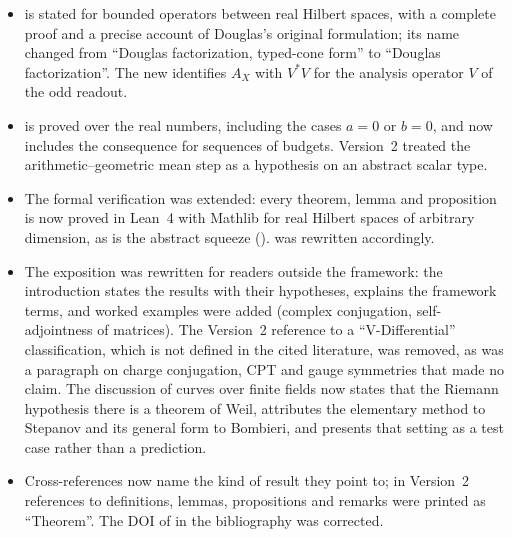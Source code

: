 \documentclass[11pt]{article}
\newcommand{\AX}{A_{X}}
\theoremstyle{definition}
\begin{document}
\begin{itemize}
    state the consequences: the theorem does not make confinement
    easier to prove, its role is to fix the form of a bridge argument,
    and SDTC cannot hold for all involutive ledgers (the
    complex-conjugation example is a counterexample).  Version~2 did
    not state the converse or these consequences.
  \item {} is stated for
    bounded operators between real Hilbert spaces, with a complete proof
    and a precise account of Douglas's original formulation; its name
    changed from ``Douglas factorization, typed-cone form'' to
    ``Douglas factorization''.  The new
     identifies \(\AX\)
    with \(V^*V\) for the analysis operator \(V\) of the odd readout.
  \item {} is proved
    over the real numbers, including the cases \(a=0\) or \(b=0\), and
    now includes the consequence for sequences of budgets.  Version~2
    treated the arithmetic--geometric mean step as a hypothesis on an
    abstract scalar type.
  \item The formal verification was extended: every theorem, lemma
    and proposition is now proved in Lean~4 with Mathlib for real Hilbert
    spaces of arbitrary dimension, as is the abstract squeeze
    ().
     was rewritten accordingly.
  \item The exposition was rewritten for readers outside the framework:
    the introduction states the results with their hypotheses,
     explains the framework terms, and worked
    examples were added (complex conjugation, self-adjointness of
    matrices).  The Version~2 reference to a ``V-Differential''
    classification, which is not defined in the cited literature, was
    removed, as was a paragraph on charge conjugation, CPT and gauge
    symmetries that made no claim.  The discussion of curves over finite
    fields now states
    that the Riemann hypothesis there is a theorem of Weil, attributes
    the elementary method to Stepanov and its general form to Bombieri,
    and presents that setting as a test case rather than a prediction.
  \item Cross-references now name the kind of result they point to;
    in Version~2 references to definitions, lemmas, propositions and
    remarks were printed as ``Theorem''.  The DOI of
    \citet{Stepanov1969} in the bibliography was corrected.
\end{itemize}
\end{document}
